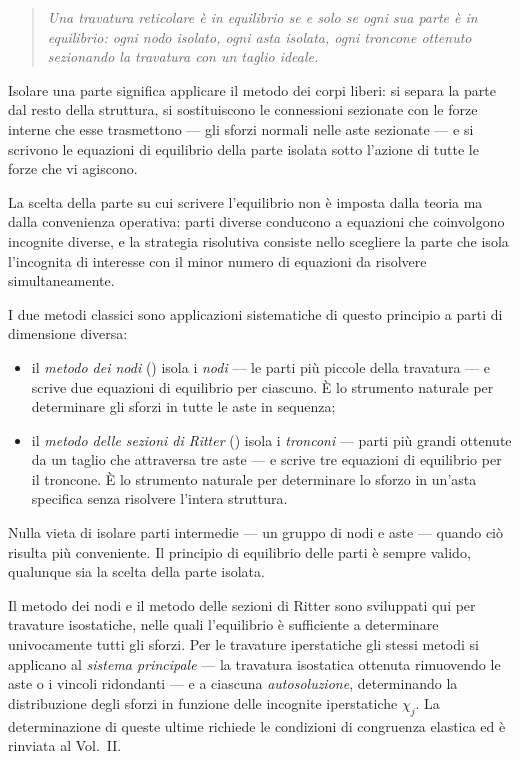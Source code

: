 \begin{quote}
	\itshape
	Una travatura reticolare è in equilibrio se e
	solo se ogni sua parte è in equilibrio: ogni
	nodo isolato, ogni asta isolata, ogni troncone
	ottenuto sezionando la travatura con un taglio
	ideale.
\end{quote}

Isolare una parte significa applicare il metodo
dei corpi liberi: si separa la parte dal resto
della struttura, si sostituiscono le connessioni
sezionate con le forze interne che esse trasmettono
--- gli sforzi normali nelle aste sezionate ---
e si scrivono le equazioni di equilibrio della
parte isolata sotto l'azione di tutte le forze
che vi agiscono.

La scelta della parte su cui scrivere l'equilibrio
non è imposta dalla teoria ma dalla convenienza
operativa: parti diverse conducono a equazioni
che coinvolgono incognite diverse, e la strategia
risolutiva consiste nello scegliere la parte che
isola l'incognita di interesse con il minor numero
di equazioni da risolvere simultaneamente.

I due metodi classici sono applicazioni sistematiche
di questo principio a parti di dimensione diversa:

\begin{itemize}[noitemsep]
	\item il \emph{metodo dei nodi}
	() isola i
	\emph{nodi} --- le parti più piccole
	della travatura --- e scrive due equazioni
	di equilibrio per ciascuno. È lo strumento
	naturale per determinare gli sforzi in
	tutte le aste in sequenza;
	\item il \emph{metodo delle sezioni di Ritter}
	() isola i
	\emph{tronconi} --- parti più grandi
	ottenute da un taglio che attraversa
	tre aste --- e scrive tre equazioni di
	equilibrio per il troncone. È lo strumento
	naturale per determinare lo sforzo in
	un'asta specifica senza risolvere l'intera
	struttura.
\end{itemize}

Nulla vieta di isolare parti intermedie --- un
gruppo di nodi e aste --- quando ciò risulta
più conveniente. Il principio di equilibrio delle
parti è sempre valido, qualunque sia la scelta
della parte isolata.


\begin{oss}
	Il metodo dei nodi e il metodo delle sezioni di
	Ritter sono sviluppati qui per travature isostatiche,
	nelle quali l'equilibrio è sufficiente a determinare
	univocamente tutti gli sforzi. Per le travature
	iperstatiche gli stessi metodi si applicano al
	\emph{sistema principale} --- la travatura isostatica
	ottenuta rimuovendo le aste o i vincoli ridondanti
	--- e a ciascuna \emph{autosoluzione}, determinando
	la distribuzione degli sforzi in funzione delle
	incognite iperstatiche $\chi_j$. La determinazione
	di queste ultime richiede le condizioni di congruenza
	elastica ed è rinviata al Vol.~II.
\end{oss}

